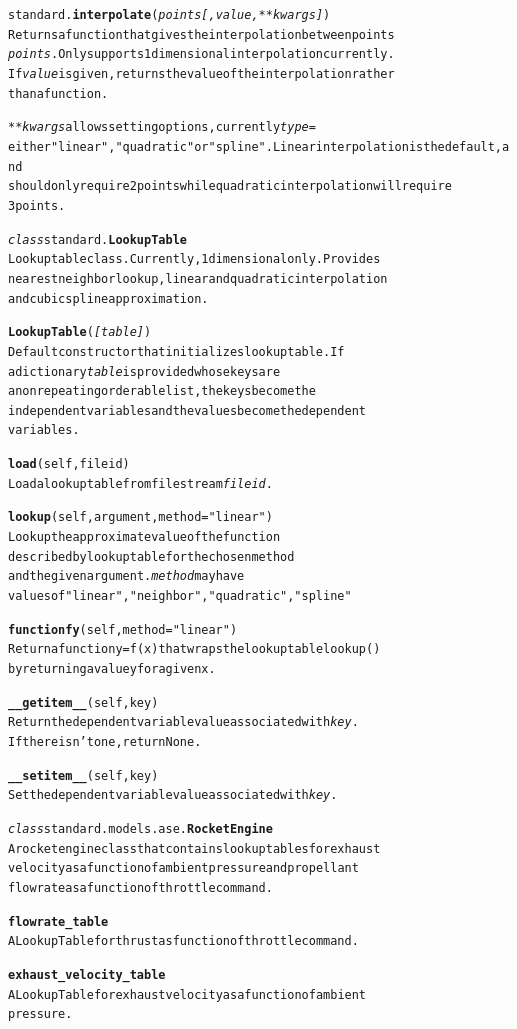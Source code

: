 \documentclass{book}
\begin{document}
\begin{alltt}
standard.\textbf{interpolate}(\emph{points [, value, **kwargs ]} )
    Returns a function that gives the interpolation between points
    \emph{points}. Only supports 1 dimensional interpolation currently.
    If \emph{value} is given, returns the value of the interpolation rather
    than a function.

    \emph{**kwargs} allows setting options, currently \emph{type=}
    either "linear", "quadratic" or "spline". Linear interpolation is the default, and
    should only require 2 points while quadratic interpolation will require
    3 points.
	
\emph{class} standard.\textbf{LookupTable }
    Lookup table class. Currently, 1 dimensional only. Provides
    nearest neighbor lookup, linear and quadratic interpolation
    and cubic spline approximation. 

  \textbf{LookupTable}(\emph{[table]} )
      Default constructor that initializes lookup table. If 
      a dictionary \emph{table} is provided whose keys are
      a non repeating orderable list, the keys become the
      independent variables and the values become the dependent
      variables.

  \textbf{load}(self,fileid)
      Load a lookup table from file stream \emph{fileid}.

  \textbf{lookup}(self,argument, method="linear")
      Look up the approximate value of the function
      described by lookup table for the chosen method
      and the given argument. \emph{method} may have
      values of "linear", "neighbor","quadratic","spline"

  \textbf{functionfy}(self,method="linear")
      Return a function y = f(x) that wraps the lookup table lookup()
      by returning a value y for a given x.

  \textbf{__getitem__}(self,key)
      Return the dependent variable value associated with \emph{key}.
      If there isn't one, return None.

  \textbf{__setitem__}(self,key)
      Set the dependent variable value associated with \emph{key}.

\emph{class} standard.models.ase.\textbf{RocketEngine}
  A rocket engine class that contains lookup tables for exhaust
  velocity  as a function of ambient pressure and propellant 
  flowrate as a function of throttle command.

  \textbf{flowrate_table} 
    A LookupTable for thrust as function of throttle command.

  \textbf{exhaust_velocity_table}
    A LookupTable for exhaust velocity as a function of ambient
    pressure.


\end{alltt}
\end{document}

